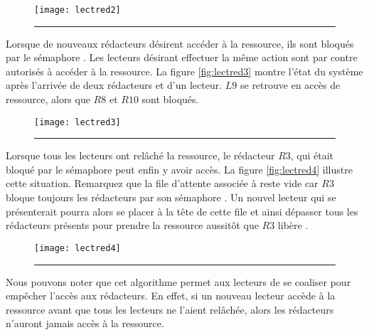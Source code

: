 \begin{figure}[!ht]
\begin{center}
\texttt{[image: lectred2]}
\end{center}
\vspace{-.3cm}
\rule{\textwidth}{0.01in}
\end{figure}

Lorsque de nouveaux rédacteurs désirent accéder à la ressource, ils sont bloqués par le sémaphore . Les lecteurs désirant effectuer la même action sont par contre autorisés à accéder à la ressource. La figure \ref{fig:lectred3} montre l'état du système après l'arrivée de deux rédacteurs et d'un lecteur. $L9$ se retrouve en accès de ressource, alors que $R8$ et $R10$ sont bloqués.

\begin{figure}[!ht]
\begin{center}
\texttt{[image: lectred3]}
\end{center}
\vspace{-.3cm}
\rule{\textwidth}{0.01in}
\end{figure}

Lorsque tous les lecteurs ont relâché la ressource, le rédacteur $R3$, qui était bloqué par le sémaphore  peut enfin y avoir accès.
La figure \ref{fig:lectred4} illustre cette situation.
Remarquez que la file d'attente associée à  reste vide car $R3$ bloque toujours les rédacteurs par son sémaphore . Un nouvel lecteur qui se présenterait pourra alors se placer à la tête de cette file et ainsi dépasser tous les rédacteurs présents pour prendre la ressource aussitôt que $R3$ libère .

\begin{figure}[!ht]
\begin{center}
\texttt{[image: lectred4]}
\end{center}
\vspace{-.3cm}
\rule{\textwidth}{0.01in}
\end{figure}

Nous pouvons noter que cet algorithme permet aux lecteurs de se coaliser pour empêcher l'accès aux rédacteurs. En effet, si un nouveau lecteur accède à la ressource avant que tous les lecteurs ne l'aient relâchée, alors les rédacteurs n'auront jamais accès à la ressource.

